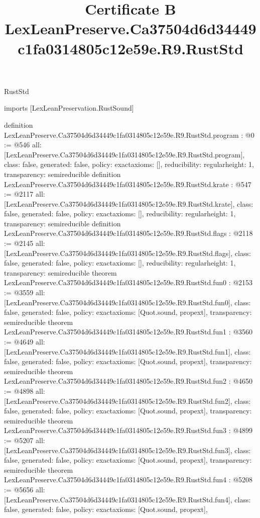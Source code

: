 \begin{lexlean}{RustStd}
\title{Certificate B LexLeanPreserve.Ca37504d6d34449c1fa0314805c12e59e.R9.RustStd}
\begin{coremodule}
imports [LexLeanPreservation.RustSound]

definition LexLeanPreserve.Ca37504d6d34449c1fa0314805c12e59e.R9.RustStd.program : @0 := @546 {
  all: [LexLeanPreserve.Ca37504d6d34449c1fa0314805c12e59e.R9.RustStd.program],
  class: false,
  generated: false,
  policy: exact{axioms: []},
  reducibility: regular{height: 1},
  transparency: semireducible
}
definition LexLeanPreserve.Ca37504d6d34449c1fa0314805c12e59e.R9.RustStd.krate : @547 := @2117 {
  all: [LexLeanPreserve.Ca37504d6d34449c1fa0314805c12e59e.R9.RustStd.krate],
  class: false,
  generated: false,
  policy: exact{axioms: []},
  reducibility: regular{height: 1},
  transparency: semireducible
}
definition LexLeanPreserve.Ca37504d6d34449c1fa0314805c12e59e.R9.RustStd.flags : @2118 := @2145 {
  all: [LexLeanPreserve.Ca37504d6d34449c1fa0314805c12e59e.R9.RustStd.flags],
  class: false,
  generated: false,
  policy: exact{axioms: []},
  reducibility: regular{height: 1},
  transparency: semireducible
}
theorem LexLeanPreserve.Ca37504d6d34449c1fa0314805c12e59e.R9.RustStd.fun0 : @2153 := @3559 {
  all: [LexLeanPreserve.Ca37504d6d34449c1fa0314805c12e59e.R9.RustStd.fun0],
  class: false,
  generated: false,
  policy: exact{axioms: [Quot.sound, propext]},
  transparency: semireducible
}
theorem LexLeanPreserve.Ca37504d6d34449c1fa0314805c12e59e.R9.RustStd.fun1 : @3560 := @4649 {
  all: [LexLeanPreserve.Ca37504d6d34449c1fa0314805c12e59e.R9.RustStd.fun1],
  class: false,
  generated: false,
  policy: exact{axioms: [Quot.sound, propext]},
  transparency: semireducible
}
theorem LexLeanPreserve.Ca37504d6d34449c1fa0314805c12e59e.R9.RustStd.fun2 : @4650 := @4898 {
  all: [LexLeanPreserve.Ca37504d6d34449c1fa0314805c12e59e.R9.RustStd.fun2],
  class: false,
  generated: false,
  policy: exact{axioms: [Quot.sound, propext]},
  transparency: semireducible
}
theorem LexLeanPreserve.Ca37504d6d34449c1fa0314805c12e59e.R9.RustStd.fun3 : @4899 := @5207 {
  all: [LexLeanPreserve.Ca37504d6d34449c1fa0314805c12e59e.R9.RustStd.fun3],
  class: false,
  generated: false,
  policy: exact{axioms: [Quot.sound, propext]},
  transparency: semireducible
}
theorem LexLeanPreserve.Ca37504d6d34449c1fa0314805c12e59e.R9.RustStd.fun4 : @5208 := @5656 {
  all: [LexLeanPreserve.Ca37504d6d34449c1fa0314805c12e59e.R9.RustStd.fun4],
  class: false,
  generated: false,
  policy: exact{axioms: [Quot.sound, propext]},
}
\end{coremodule}
\end{lexlean}
